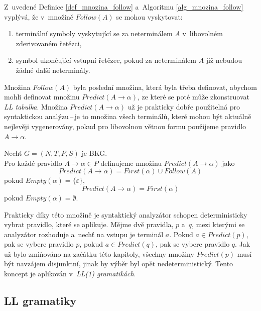 Z~uvedené Definice \ref{def_mnozina_follow} a~Algoritmu \ref{alg_mnozina_follow} vyplývá, že v~množině $Follow(A)$ se mohou vyskytovat:
\begin{enumerate}
    \item terminální symboly vyskytující se za neterminálem $A$ v~libovolném zderivovaném řetězci,
    \item symbol ukončující vstupní řetězec, pokud za neterminálem $A$ již nebudou žádné další neterminály. 
\end{enumerate}

Množina $Follow(A)$ byla poslední množina, která byla třeba definovat, abychom mohli definovat množinu $Predict(A \rightarrow \alpha)$, ze které se poté může zkonstruovat \emph{LL tabulka}.
Množina $Predict(A \rightarrow \alpha)$ už je prakticky dobře použitelná pro syntaktickou analýzu\,--\,je to množina všech terminálů, které mohou být aktuálně nejlevěji vygenerovány, pokud pro libovolnou větnou formu použijeme pravidlo $A \rightarrow \alpha$.
\begin{definition}
    Nechť $G = (N, T, P, S)$ je BKG.\\
    Pro každé pravidlo $A \rightarrow \alpha \in P$ definujeme množinu $Predict(A \rightarrow \alpha)$ jako
    \begin{equation*}
        Predict(A \rightarrow \alpha) = First(\alpha) \cup Follow(A)
    \end{equation*}
    pokud $Empty(\alpha) = \{\varepsilon\}$,
    \begin{equation*}
        Predict(A \rightarrow \alpha) = First(\alpha)
    \end{equation*}
    pokud $Empty(\alpha) = \emptyset$.
\end{definition}
Prakticky díky této množině je syntaktický analyzátor schopen deterministicky vybrat pravidlo, které se aplikuje.
Mějme dvě pravidla, $p$ a~$q$, mezi kterými se analyzátor rozhoduje a~nechť na vstupu je terminál $a$.
Pokud $a \in Predict(p)$, pak se vybere pravidlo $p$, pokud $a \in Predict(q)$, pak se vybere pravidlo $q$.
Jak už bylo zmiňováno na začátku této kapitoly, všechny množiny $Predict(p)$ musí být navzájem disjunktní, jinak by výběr byl opět nedeterministický.
Tento koncept je aplikován v~\emph{LL(1) gramatikách}.

\subsection*{LL gramatiky}

